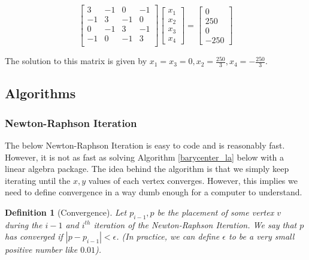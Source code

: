 \documentclass[11pt]{report}
\newcommand{\abs}[1]{\left|#1\right|}
\newtheorem{defn}{Definition}[section]
\begin{document}
\[
\begin{bmatrix}
    3 & -1 & 0 & -1 \\
    -1 & 3 & -1 & 0 \\
    0 & -1 & 3 & -1 \\
    -1 & 0 & -1 & 3 \\
\end{bmatrix}
\begin{bmatrix} x_1 \\ x_2 \\ x_3 \\ x_4 \end{bmatrix} =
\begin{bmatrix} 0 \\ 250 \\ 0 \\ -250 \end{bmatrix}
\]

The solution to this matrix is given by $x_1 = x_3 = 0, x_2 = \frac{250}{3}, x_4 = -\frac{250}{3}$.

\subsection{Algorithms}
\subsubsection{Newton-Raphson Iteration}
The below Newton-Raphson Iteration is easy to code and is reasonably fast. However, it is not as fast as solving Algorithm \ref{barycenter_la} below with a linear algebra package. The idea behind the algorithm is that we simply keep iterating until the $x, y$ values of each vertex converges. However, this implies we need to define convergence in a way dumb enough for a computer to understand.

\begin{defn}[Convergence]
    Let $p_{i - 1}, p$ be the placement of some vertex $v$ during the $i - 1$ and $i^{th}$ iteration of the Newton-Raphson Iteration. We say that $p$ has converged if $\abs{p - p_{i - 1}} < \epsilon$. (In practice, we can define $\epsilon$ to be a very small positive number like $0.01$).
\end{defn}
\end{document}

